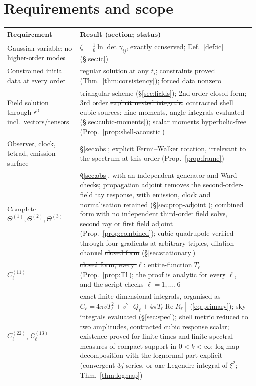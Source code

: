 \section{Requirements and scope}\label{app:requirements}
\begin{center}
\begin{longtable}{p{6.4cm}p{8.6cm}}
\toprule
Requirement & Result (section; status) \\\midrule\endhead
Gaussian variable; no higher-order modes & $\zeta=\frac16\ln\det\gamma_{ij}$, exactly conserved; Def.~\ref{def:ic} (\S\ref{sec:ic}) \\
Constrained initial data at every order & regular solution at any $t_i$; constraints proved (Thm.~\ref{thm:consistency}); forced data nonzero \\
Field solution through $\epsilon^3$ incl.\ vectors/tensors & triangular scheme (\S\ref{sec:fields}); 2nd order \st{closed form}; 3rd order \st{explicit nested integrals}; contracted shell cubic sources: \st{nine moments, angle integrals evaluated} (\S\ref{sec:cubic-moments}); scalar moments hyperbolic-free (Prop.~\ref{prop:shell-acoustic}) \\
Observer, clock, tetrad, emission surface & \S\ref{sec:obs}; explicit Fermi--Walker rotation, irrelevant to the spectrum at this order (Prop.~\ref{prop:frame}) \\
Complete $\Theta^{(1)},\Theta^{(2)},\Theta^{(3)}$ & \S\ref{sec:obs}, with an independent generator and Ward checks; propagation adjoint removes the second-order-field ray response, with emission, clock and normalisation retained (\S\ref{sec:prop-adjoint}); combined form with no independent third-order field solve, second ray or first field adjoint (Prop.~\ref{prop:combined}); cubic quadrupole \st{verified through four gradients at arbitrary triples}, dilation channel \st{closed form} (\S\ref{sec:stationary}) \\
$C_\ell^{(11)}$ & \st{closed form, every $\ell$}: entire-function $T_\ell$ (Prop.~\ref{prop:Tl}); the proof is analytic for every $\ell$, and the script checks $\ell=1,\dots,6$ \\
$C_\ell^{(22)}$, $C_\ell^{(13)}$ & \st{exact finite-dimensional integrals}, organised as $C_\ell=4\pi vT_\ell^2+v^2[Q_\ell+4\pi T_\ell\operatorname{Re}R_\ell]$ (\eqref{eq:primary}); sky integrals evaluated (\S\ref{sec:spec}); shell metric reduced to two amplitudes, contracted cubic response scalar; existence proved for finite times and finite spectral measures of compact support in $0<k<\infty$; log-map decomposition with the lognormal part \st{explicit} (convergent $3j$ series, or one Legendre integral of $\xi^2$; Thm.~\ref{thm:logmap}) \\

\end{longtable}
\end{center}
